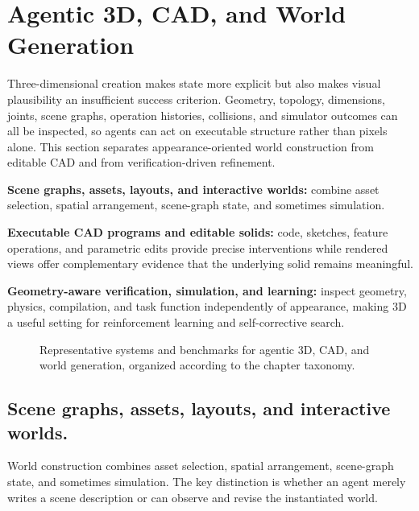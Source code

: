 \section{Agentic 3D, CAD, and World Generation}
\label{sec:3d-cad-world}

Three-dimensional creation makes state more explicit but also makes visual plausibility an insufficient success criterion. Geometry, topology, dimensions, joints, scene graphs, operation histories, collisions, and simulator outcomes can all be inspected, so agents can act on executable structure rather than pixels alone. This section separates appearance-oriented world construction from editable CAD and from verification-driven refinement.

\begin{keytakeaway}
\begin{keypoints}
  \item \textbf{Scene graphs, assets, layouts, and interactive worlds:} combine asset selection, spatial arrangement, scene-graph state, and sometimes simulation.

  \item \textbf{Executable CAD programs and editable solids:} code, sketches, feature operations, and parametric edits provide precise interventions while rendered views offer complementary evidence that the underlying solid remains meaningful.

  \item \textbf{Geometry-aware verification, simulation, and learning:} inspect geometry, physics, compilation, and task function independently of appearance, making 3D a useful setting for reinforcement learning and self-corrective search.
\end{keypoints}
\end{keytakeaway}

\begin{figure}[!htbp]
  \centering
  
  \caption{Representative systems and benchmarks for agentic 3D, CAD, and world generation, organized according to the chapter taxonomy.}
  \label{fig:ch6-representative-systems}
\end{figure}

\subsection{Scene graphs, assets, layouts, and interactive worlds.}
World construction combines asset selection, spatial arrangement, scene-graph state, and sometimes simulation. The key distinction is whether an agent merely writes a scene description or can observe and revise the instantiated world.

